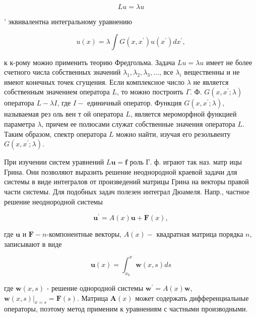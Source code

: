 \documentclass[10pt]{article}
\begin{document}
\[

L u=\lambda u

\]



' эквивалентна интегральному уравнению



\[

u(x)=\lambda \int G\left(x, x^{\prime}\right) u\left(x^{\prime}\right) d x^{\prime},

\]



к к-рому можно применить теорию Фредгольма. Задача $L u=\lambda u$ имеет не более счетного числа собственных значений $\lambda_{1}, \lambda_{2}, \lambda_{3}, \ldots$, все $\lambda_{i}$ вещественны и не имеют конечных точек сгущения. Если комплексное число $\lambda$ не является собственным значением оператора $L$, то можно построить $\Gamma$. Ф. $G\left(x, x^{\prime} ; \lambda\right)$ оператора $L-\lambda I$, где $I-$ единичный оператор. Функция $G\left(x, x^{\prime} ; \lambda\right)$, называемая рез оль вен т ой оператора $L$, является мероморфной функцией параметра $\lambda$, причем ее полюсами служат собственные значения оператора $L$. Таким образом, спектр оператора $L$ можно найти, изучая его резольвенту $G\left(x, x^{\prime} ; \lambda\right)$.



При изучении систем уравнений $L \boldsymbol{u}=\boldsymbol{f}$ роль Г. ф. играют так наз. матр ицы Грина. Они позволяют выразить решение неоднородной краевой задачи для системы в виде интегралов от произведений матрицы Грина на векторы правой части системы. Для подобных задач полезен интеграл Дюамеля. Напр., частное решение неоднородной системы



\[

\boldsymbol{u}^{\prime}=A(x) \boldsymbol{u}+\boldsymbol{F}(x),

\]



где $\boldsymbol{u}$ и $\boldsymbol{F}-n$-компонентные векторы, $A(x)-$ квадратная матрица порядка $n$, записывают в виде



\[

\boldsymbol{u}(x)=\int_{x_{0}}^{x} \boldsymbol{w}(x, s) d s

\]



где $\boldsymbol{w}(x, s)$ - решение однородной системы $\boldsymbol{w}^{\prime}=A(x) \boldsymbol{w}$, $\left.\boldsymbol{w}(x, s)\right|_{x=s}=\boldsymbol{F}(s)$. Матрица $\boldsymbol{A}(x)$ может содержать дифференциальные операторы, поэтому метод применим к уравнениям с частными производными.
\end{document}
